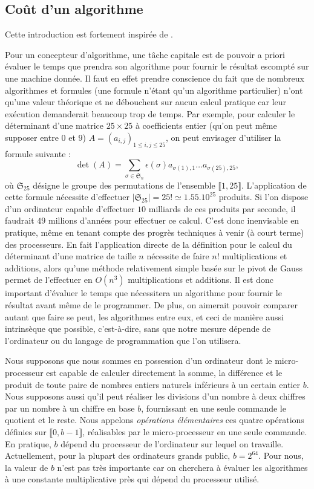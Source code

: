 \documentclass[12pt]{report}
\begin{document}
\subsection{Coût d'un algorithme}
 
Cette introduction est fortement inspirée de \cite{picart1999cours}. 
 
Pour un concepteur d'algorithme, une tâche capitale est de pouvoir a priori évaluer le
temps que prendra son algorithme pour fournir le résultat escompté sur une machine
donnée. Il faut en effet prendre conscience du fait que de nombreux algorithmes et 
formules (une formule n'étant qu'un algorithme particulier) n'ont qu'une valeur théorique
et ne débouchent sur aucun calcul pratique car leur exécution demanderait beaucoup trop
de temps. Par exemple, pour calculer le déterminant d'une matrice $25 \times 25$ à coefficients entier (qu'on peut même supposer entre $0$ et $9$) $A = (a_{i,j})_{1\leq i,j\leq 25}$, on peut envisager d'utiliser la formule suivante : \[\det(A)=\sum_{\sigma \in \mathfrak{S}_n} \epsilon(\sigma) a_{\sigma(1),1}\ldots a_{\sigma(25),25},\] où $\mathfrak{S}_{25}$ désigne le groupe des permutations de l'ensemble $\llbracket 1, 25\rrbracket$. L'application de cette formule nécessite d'effectuer $|\mathfrak{S}_{25}|=25 !\simeq 1.55.10^{25}$ produits. Si l'on dispose d'un ordinateur capable d'effectuer $10$ milliards de ces produits par seconde, il faudrait $49$ millions d'années pour effectuer ce calcul. C'est donc inenvisable en pratique, même en tenant compte des progrès techniques à venir (à court terme) des processeurs. En fait l'application directe de la définition pour le calcul du déterminant d'une matrice de taille $n$ nécessite de faire $n!$ multiplications et additions, alors qu'une méthode relativement simple basée sur le pivot de Gauss permet de l'effectuer en $O(n^3)$ multiplications et additions.   
Il est donc important d'évaluer le temps que nécessitera un algorithme pour fournir
le résultat avant même de le programmer. De plus, on aimerait pouvoir comparer autant que faire se peut,
les algorithmes entre eux, et ceci de manière aussi intrinsèque que possible, c'est-à-dire,
sans que notre mesure dépende de l'ordinateur ou du langage de programmation que l'on
utilisera. 




Nous supposons   que nous sommes en possession d'un ordinateur dont le micro-processeur est capable de calculer  directement la somme, la différence et le produit de toute paire de nombres entiers naturels inférieurs à un certain entier $b$. Nous supposons aussi
qu'il peut réaliser les divisions d'un nombre à deux chiffres par un nombre à un chiffre
en base $b$, fournissant en une seule commande le quotient et le reste. Nous appelons
\textit{opérations élémentaires}  ces quatre opérations définies sur $\llbracket 0,b-1\rrbracket$, réalisables
par le micro-processeur en une seule commande. En pratique, $b$ dépend du processeur de l'ordinateur sur lequel on travaille. Actuellement, pour la plupart des ordinateurs grands public, $b =2^{64}$. Pour nous, la valeur de $b$ n'est pas très importante car on cherchera à évaluer les algorithmes à une constante multiplicative près qui dépend du processeur utilisé. 
\end{document}
